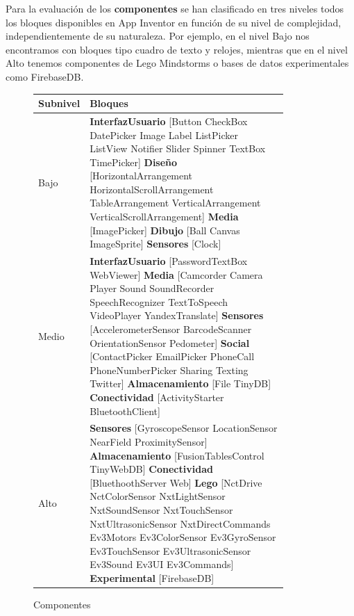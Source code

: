 \documentclass[a4paper, 12pt]{book}
\begin{document}
Para la evaluación de los \textbf{componentes} se han clasificado en tres niveles todos los bloques disponibles en App Inventor en función de su nivel de complejidad, independientemente de su naturaleza. Por ejemplo, en el nivel Bajo nos encontramos con bloques tipo cuadro de texto y relojes, mientras que en el nivel Alto tenemos componentes de Lego Mindstorms o bases de datos experimentales como FirebaseDB. 

\begin{figure}[H]
	\begin{center}
	    \begin{tabular}{| l | p{0.85\linewidth} | }
	    \hline
	    \textbf{Subnivel} & \textbf{Bloques} \\ \hline
		Bajo & \textbf{InterfazUsuario} [Button CheckBox DatePicker Image Label ListPicker ListView Notifier Slider Spinner TextBox TimePicker] \textbf{Diseño} [HorizontalArrangement HorizontalScrollArrangement TableArrangement VerticalArrangement VerticalScrollArrangement] \textbf{Media} [ImagePicker] \textbf{Dibujo} [Ball Canvas ImageSprite] \textbf{Sensores} [Clock] \\ \hline
		Medio & \textbf{InterfazUsuario} [PasswordTextBox WebViewer] \textbf{Media} [Camcorder Camera Player Sound SoundRecorder SpeechRecognizer TextToSpeech VideoPlayer YandexTranslate] \textbf{Sensores} [AccelerometerSensor BarcodeScanner OrientationSensor Pedometer] \textbf{Social} [ContactPicker EmailPicker PhoneCall PhoneNumberPicker Sharing Texting Twitter] \textbf{Almacenamiento} [File TinyDB] \textbf{Conectividad} [ActivityStarter BluetoothClient]\\ \hline
		Alto & \textbf{Sensores} [GyroscopeSensor LocationSensor NearField ProximitySensor] \textbf{Almacenamiento} [FusionTablesControl TinyWebDB] \textbf{Conectividad} [BluethoothServer Web] \textbf{Lego} [NctDrive NctColorSensor NxtLightSensor NxtSoundSensor NxtTouchSensor NxtUltrasonicSensor NxtDirectCommands Ev3Motors Ev3ColorSensor Ev3GyroSensor Ev3TouchSensor Ev3UltrasonicSensor Ev3Sound Ev3UI Ev3Commands] \textbf{Experimental} [FirebaseDB]\\ \hline
            \end{tabular}
	\end{center}
	\caption{Componentes}
	\label{fig:componentsScore}
\end{figure}
\end{document}

